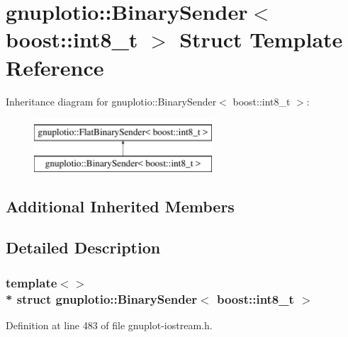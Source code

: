 \hypertarget{structgnuplotio_1_1_binary_sender_3_01boost_1_1int8__t_01_4}{}\section{gnuplotio\+:\+:Binary\+Sender$<$ boost\+:\+:int8\+\_\+t $>$ Struct Template Reference}
\label{structgnuplotio_1_1_binary_sender_3_01boost_1_1int8__t_01_4}
Inheritance diagram for gnuplotio\+:\+:Binary\+Sender$<$ boost\+:\+:int8\+\_\+t $>$\+:\begin{figure}[H]
\begin{center}
\leavevmode
\includegraphics[height=2.000000cm]{structgnuplotio_1_1_binary_sender_3_01boost_1_1int8__t_01_4}
\end{center}
\end{figure}
\subsection*{Additional Inherited Members}


\subsection{Detailed Description}
\subsubsection*{template$<$$>$\\*
struct gnuplotio\+::\+Binary\+Sender$<$ boost\+::int8\+\_\+t $>$}



Definition at line 483 of file gnuplot-\/iostream.\+h.

